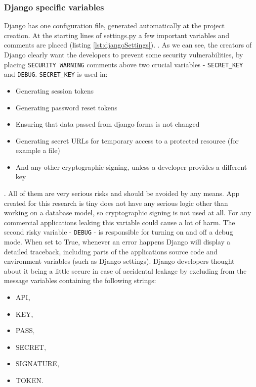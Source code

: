 \subsubsection{Django specific variables}
Django has one configuration file, generated automatically at the project creation. At the starting lines of settings.py a few important variables and comments are placed (listing \ref{lst:djangoSettings}).
.
As we can see, the creators of Django clearly want the developers to prevent some security vulnerabilities, by placing \lstinline{SECURITY WARNING} comments above two crucial variables - \lstinline{SECRET_KEY} and \lstinline{DEBUG}.
\lstinline{SECRET_KEY} is used in:
\begin{itemize}
      \item Generating session tokens
      \item Generating password reset tokens
      \item Ensuring that data passed from django forms is not changed
      \item Generating secret URLs for temporary access to a protected resource (for example a file)
      \item And any other cryptographic signing, unless a developer provides a different key
\end{itemize}. \cite{djangoSecretKey} \cite{djangoSigning}
All of them are very serious risks and should be avoided by any means. App created for this research is tiny does not have any serious logic other than working on a database model, so cryptographic signing is not used at all. For any commercial applications leaking this variable could cause a lot of harm.
The second risky variable - \lstinline{DEBUG} - is responsible for turning on and off a debug mode. When set to True, whenever an error happens Django will display a detailed traceback, including parts of the applications source code and environment variables (such as Django settings).
Django developers thought about it being a little secure in case of accidental leakage by excluding from the message variables containing the following strings:
\begin{itemize}
      \item API,
      \item KEY,
      \item PASS,
      \item SECRET,
      \item SIGNATURE,
      \item TOKEN.
\end{itemize}



